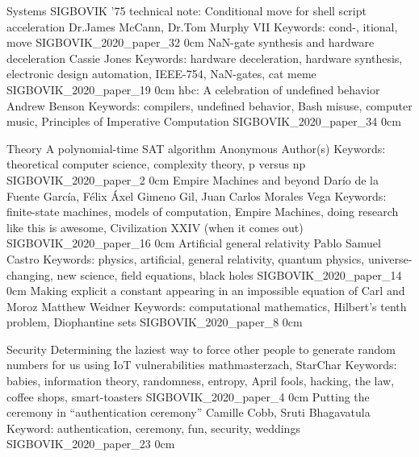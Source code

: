 \addtrack
	{}{Systems}
\addpaper
	{SIGBOVIK '75 technical note: Conditional move for shell script acceleration}
	{Dr.\@ James McCann, Dr.\@ Tom Murphy VII}
	{Keywords: cond-, itional, move}
	{SIGBOVIK_2020_paper_32}
	{0cm}
	{}
\addpaper
	{NaN-gate synthesis and hardware deceleration}
	{Cassie Jones}
	{Keywords: hardware deceleration, hardware synthesis, electronic design automation, IEEE-754, NaN-gates, cat meme}
	{SIGBOVIK_2020_paper_19}
	{0cm}
	{}
\addpaper
	{hbc: A celebration of undefined behavior}
	{Andrew Benson}
	{Keywords: compilers, undefined behavior, Bash misuse, computer music, Principles of Imperative Computation}
	{SIGBOVIK_2020_paper_34}
	{0cm}
	{}

\addtrack
	{}{Theory}
\addpaper
	{A polynomial-time SAT algorithm}
	{Anonymous Author(s)}
	{Keywords: theoretical computer science, complexity theory, p versus np}
	{SIGBOVIK_2020_paper_2}
	{0cm}
	{}
\addpaper
	{Empire Machines and beyond}
	{Dar\'io de la Fuente Garc\'ia, F\'elix \'Axel Gimeno Gil, Juan Carlos Morales Vega}
	{Keywords: finite-state machines, models of computation, Empire Machines, doing research like this is awesome, Civilization XXIV (when it comes out)}
	{SIGBOVIK_2020_paper_16}
	{0cm}
	{}
\addpaper
	{Artificial general relativity}
	{Pablo Samuel Castro}
	{Keywords: physics, artificial, general relativity, quantum physics, universe-changing, new science, field equations, black holes}
	{SIGBOVIK_2020_paper_14}
	{0cm}
	{}
\addpaper
	{Making explicit a constant appearing in an impossible equation of Carl and Moroz}
	{Matthew Weidner}
	{Keywords: computational mathematics, Hilbert's tenth problem, Diophantine sets}
	{SIGBOVIK_2020_paper_8}
	{0cm}
	{}

\addtrack
	{}{Security}
\addpaper
	{Determining the laziest way to force other people to generate random numbers for us using IoT vulnerabilities}
	{mathmasterzach, StarChar}
	{Keywords: babies, information theory, randomness, entropy, April fools, hacking, the law, coffee shops, smart-toasters}
	{SIGBOVIK_2020_paper_4}
	{0cm}
	{}
\addpaper
	{Putting the ceremony in ``authentication ceremony''}
	{Camille Cobb, Sruti Bhagavatula}
	{Keyword: authentication, ceremony, fun, security, weddings}
	{SIGBOVIK_2020_paper_23}
	{0cm}
	{}

